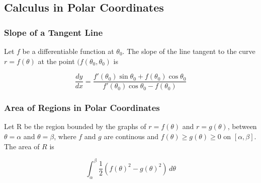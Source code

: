 \subsection{Calculus in Polar Coordinates}

\subsubsection{Slope of a Tangent Line}
Let $f$ be a differentiable function at $\theta _0$. The slope of the line tangent to the curve $r = f(\theta)$ at the point $(f(\theta _0, \theta _0)$ is

\begin{equation}
    \frac{dy}{dx} = \frac{ f'(\theta _0) \sin \theta_0 + f( \theta _0 ) \cos \theta _0 } { f'(\theta _0) \cos \theta_0 - f(\theta _0) }
\end{equation}

\subsubsection{Area of Regions in Polar Coordinates}
Let R be the region bounded by the graphs of $r = f(\theta)$ and $r = g(\theta)$, between $\theta = \alpha$ and $\theta = \beta$, where $f$ and $g$ are continous and $f(\theta) \geq g(\theta) \geq 0$ on $[\alpha, \beta]$. The area of $R$ is

\begin{equation}
    \int _{\alpha} ^{\beta} \frac{1}{2}(f(\theta)^2 - g(\theta)^2)\, d\theta
\end{equation}
